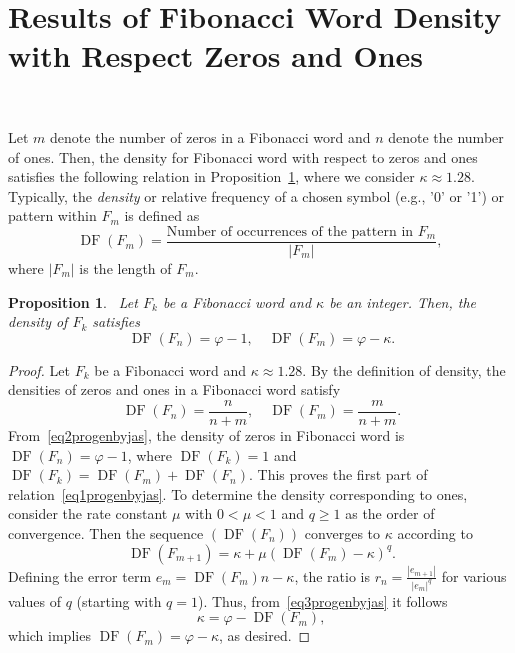 \documentclass[11pt, a4paper]{article}
\newcommand{\DF}{\operatorname{DF}}
\newtheorem{proposition}{Proposition}[section]
\theoremstyle{definition}
\begin{document}
\section{Results of Fibonacci Word Density with Respect Zeros and Ones}~\label{resec2}

Let $m$ denote the number of zeros in a Fibonacci word and $n$ denote the number of ones. Then, the density for Fibonacci word with respect to zeros and ones satisfies the following relation in Proposition~\ref{progenbyjas}, where we consider $\kappa \approx 1.28$. Typically, the \textit{density} or relative frequency of a chosen symbol (e.g., '0' or '1') or pattern within $F_m$ is defined as
\[
\DF(F_m) = \frac{\text{Number of occurrences of the pattern in } F_m}{|F_m|},
\]
where $|F_m|$ is the length of $F_m$.

\begin{proposition}~\label{progenbyjas}
Let $F_k$ be a Fibonacci word and $\kappa$ be an integer. Then, the density of $F_k$ satisfies
\begin{equation}~\label{eq1progenbyjas}
\DF(F_n) = \varphi - 1, \quad \DF(F_m) = \varphi - \kappa.
\end{equation}
\end{proposition}

\begin{proof}
Let $F_k$ be a Fibonacci word and $\kappa \approx 1.28$. By the definition of density, the densities of zeros and ones in a Fibonacci word satisfy
\begin{equation}~\label{eq2progenbyjas}
\DF(F_n) = \frac{n}{n + m}, \quad \DF(F_m) = \frac{m}{n + m}.
\end{equation}
From~\eqref{eq2progenbyjas}, the density of zeros in Fibonacci word is $\DF(F_n) = \varphi - 1$, where $\DF(F_k) = 1$ and $\DF(F_k) = \DF(F_m) + \DF(F_n)$. This proves the first part of relation~\eqref{eq1progenbyjas}. To determine the density corresponding to ones, consider the rate constant $\mu$ with $0 < \mu < 1$ and $q \geq 1$ as the order of convergence. Then the sequence $(\DF(F_n))$ converges to $\kappa$ according to
\begin{equation}~\label{eq3progenbyjas}
\DF(F_{m+1}) = \kappa + \mu (\DF(F_m) - \kappa)^q.
\end{equation}
Defining the error term $e_m = \DF(F_m)n - \kappa$, the ratio is $r_n = \frac{|e_{m+1}|}{|e_m|^q}$ for various values of $q$ (starting with $q=1$). Thus, from~\eqref{eq3progenbyjas} it follows
\begin{equation}~\label{eq4progenbyjas}
\kappa = \varphi - \DF(F_m),
\end{equation}
which implies $\DF(F_m) = \varphi - \kappa$, as desired.
\end{proof}
\end{document}
